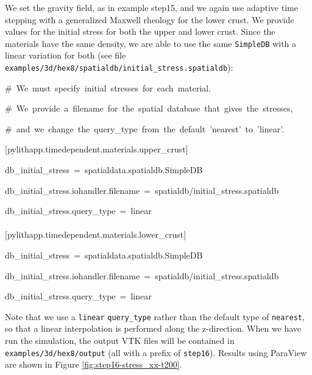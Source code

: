 We set the gravity field, as in example step15, and we again use adaptive
time stepping with a generalized Maxwell rheology for the lower crust.
We provide values for the initial stress for both the upper and lower
crust. Since the materials have the same density, we are able to use
the same \texttt{SimpleDB} with a linear variation for both (see file
\texttt{examples/3d/hex8/spatialdb/initial\_stress.spatialdb}):
\begin{lyxcode}
\#~We~must~specify~initial~stresses~for~each~material.

\#~We~provide~a~filename~for~the~spatial~database~that~gives~the~stresses,

\#~and~we~change~the~query\_type~from~the~default~'nearest'~to~'linear'.

{[}pylithapp.timedependent.materials.upper\_crust{]}

db\_initial\_stress~=~spatialdata.spatialdb.SimpleDB

db\_initial\_stress.iohandler.filename~=~spatialdb/initial\_stress.spatialdb

db\_initial\_stress.query\_type~=~linear~\\
~\\


{[}pylithapp.timedependent.materials.lower\_crust{]}

db\_initial\_stress~=~spatialdata.spatialdb.SimpleDB

db\_initial\_stress.iohandler.filename~=~spatialdb/initial\_stress.spatialdb

db\_initial\_stress.query\_type~=~linear
\end{lyxcode}
Note that we use a \texttt{linear} \texttt{query\_type} rather than
the default type of \texttt{nearest}, so that a linear interpolation
is performed along the z-direction. When we have run the simulation,
the output VTK files will be contained in \texttt{examples/3d/hex8/output}
(all with a prefix of \texttt{step16}). Results using ParaView are
shown in Figure \ref{fig:step16-stress_xx-t200}.

